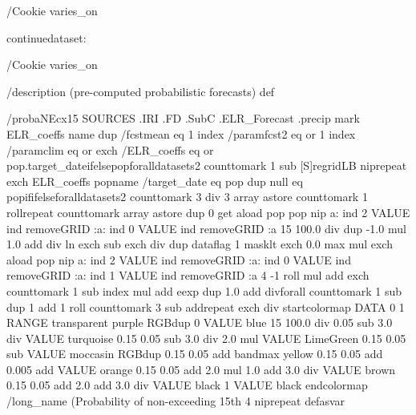 \begin{ingrid}



/Cookie varies_on

continuedataset:


/Cookie varies_on

/description (pre-computed probabilistic forecasts) def

/probaNEcx15 {
 SOURCES .IRI .FD .SubC .ELR_Forecast .precip
  mark ELR_coeffs {name dup /fcstmean eq 1 index /paramfcst2 eq or 1 index /paramclim eq or exch /ELR_coeffs eq or {pop}{.target_date}ifelse}{pop}foralldatasets2
      counttomark
       1 sub
       {[S]regridLB nip}repeat
    exch
    ELR_coeffs {pop}{name /target_date eq {pop}{ dup null eq {pop}if}ifelse}foralldatasets2 counttomark
              3 div
              {3 array astore counttomark 1 roll}repeat
       counttomark array astore
     dup
      0 get
      aload pop
        pop
       nip a:
        ind 2 VALUE
        ind removeGRID
        :a:
         ind 0 VALUE
         ind removeGRID
         :a
       15
        100.0 div
        dup
         -1.0 mul
         1.0 add
         div
        ln exch sub
       exch div
      dup dataflag
       1 masklt
       exch
       0.0 max
       mul
      exch
      {aload pop nip a: ind 2 VALUE ind removeGRID :a: ind 0 VALUE ind removeGRID :a: ind 1 VALUE ind removeGRID :a 4 -1 roll mul add exch counttomark 1 sub index mul add eexp dup 1.0 add div}forall counttomark
         1 sub
         dup
          1 add
          1 roll
         counttomark
          3 sub
          {add}repeat
       exch div
      startcolormap DATA
        0 1 RANGE
        transparent purple RGBdup
           0 VALUE
           blue 15
             100.0 div
             0.05 sub
             3.0 div
             VALUE
            turquoise 0.15
              0.05 sub
              3.0 div
              2.0 mul
              VALUE
             LimeGreen 0.15
               0.05 sub
               VALUE
              moccasin RGBdup 0.15
                 0.05 add
                 bandmax
                yellow 0.15
                  0.05 add
                  0.005 add
                  VALUE
                 orange 0.15
                   0.05 add
                   2.0 mul
                   1.0 add
                   3.0 div
                   VALUE
                  brown 0.15
                    0.05 add
                    2.0 add
                    3.0 div
                    VALUE
                   black
                    1 VALUE
                    black endcolormap
      /long_name (Probability of non-exceeding 15th %
      4 {nip}repeat
}defasvar


\end{ingrid}
